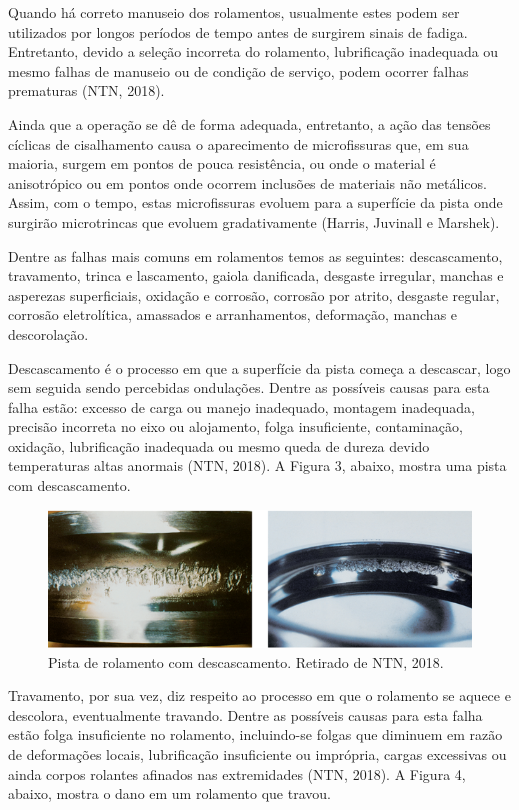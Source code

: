 \documentclass[
	12pt,				
	oneside,			
	a4paper,			
	english,			
	brazil				
	]{abntex2ppgsi}
\begin{document}
Quando há correto manuseio dos rolamentos, usualmente estes podem ser utilizados por longos períodos de tempo antes de surgirem sinais de fadiga. Entretanto, devido a seleção incorreta do rolamento, lubrificação inadequada ou mesmo falhas de manuseio ou de condição de serviço, podem ocorrer falhas prematuras (NTN, 2018).

Ainda que a operação se dê de forma adequada, entretanto, a ação das tensões cíclicas de cisalhamento causa o aparecimento de microfissuras que, em sua maioria, surgem em pontos de pouca resistência, ou onde o material é anisotrópico  ou em pontos onde ocorrem inclusões de materiais não metálicos. Assim, com o tempo, estas microfissuras evoluem para a superfície da pista onde surgirão microtrincas que evoluem gradativamente (Harris, Juvinall e Marshek).

Dentre as falhas mais comuns em rolamentos temos as seguintes: descascamento, travamento, trinca e lascamento, gaiola danificada, desgaste irregular, manchas e asperezas superficiais, oxidação e corrosão, corrosão por atrito, desgaste regular, corrosão eletrolítica, amassados e arranhamentos, deformação, manchas e descorolação.

Descascamento é o processo em que a superfície da pista começa a descascar, logo sem seguida sendo percebidas ondulações. Dentre as possíveis causas para esta falha estão: excesso de carga ou manejo inadequado, montagem inadequada, precisão incorreta no eixo ou alojamento, folga insuficiente, contaminação, oxidação, lubrificação inadequada ou mesmo queda de dureza devido temperaturas altas anormais (NTN, 2018). A Figura 3, abaixo, mostra uma pista com descascamento.

\begin{figure}[!htb]
\centering
\includegraphics{Figura3}
\caption {Pista de rolamento com descascamento. Retirado de NTN, 2018.}
\label{Figura3}
\end{figure}

Travamento, por sua vez, diz respeito ao processo em que o rolamento se aquece e descolora, eventualmente travando. Dentre as possíveis causas para esta falha estão folga insuficiente no rolamento, incluindo-se folgas que diminuem em razão de deformações locais, lubrificação insuficiente ou imprópria, cargas excessivas ou ainda corpos rolantes afinados nas extremidades (NTN, 2018). A Figura 4, abaixo, mostra o dano em um rolamento que travou.
\end{document}
